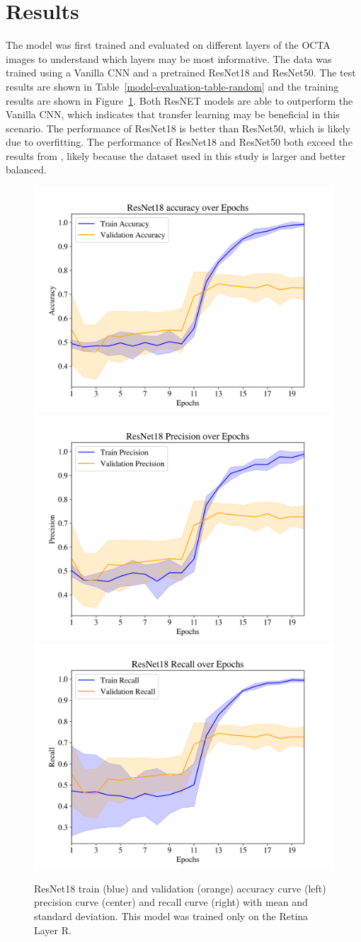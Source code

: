 \documentclass{article} %
\begin{document}
\section{Results}
The model was first trained and evaluated on different layers of the OCTA images to understand which layers may be most informative. The data was trained using a Vanilla CNN and a pretrained ResNet18 and ResNet50. The test results are shown in Table~\ref{model-evaluation-table-random} and the training results are shown in Figure~\ref{fig:resnet18-random}. Both ResNET models are able to outperform the Vanilla CNN, which indicates that transfer learning may be beneficial in this scenario. The performance of ResNet18 is better than ResNet50, which is likely due to overfitting. The performance of ResNet18 and ResNet50 both exceed the results from \citet{WISELY2024100355}, likely because the dataset used in this study is larger and better balanced.

\begin{figure}[h]
   \begin{center}
   \label{fig:resnet18-random}
   \includegraphics[width=.30\linewidth]{../plots/resnet18/accuracy.png}
   \includegraphics[width=.30\linewidth]{../plots/resnet18/precision.png}
   \includegraphics[width=.30\linewidth]{../plots/resnet18/recall.png}
   \end{center}
   \caption{ResNet18 train (blue) and validation (orange) accuracy curve (left) precision curve (center) and recall curve (right) with mean and standard deviation. This model was trained only on the Retina Layer R.}
   \end{figure}
\end{document}
